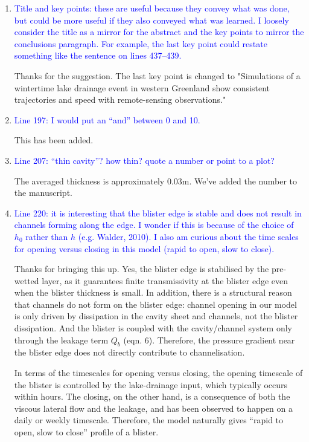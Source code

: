 \documentclass[11pt]{article}
\begin{document}
\begin{enumerate}
\item \textcolor{blue}{Title and key points: these are useful because they convey what was done, but could be more useful if they also conveyed what was learned. I loosely consider the title as a mirror for the abstract and the key points to mirror the conclusions paragraph. For example, the last key point could restate something like the sentence on lines 437--439.}

Thanks for the suggestion. The last key point is changed to "Simulations of a wintertime lake drainage event in western Greenland show consistent trajectories and speed with remote-sensing observations."

\item \textcolor{blue}{Line 197: I would put an ``and'' between 0 and 10.}

This has been added.

\item \textcolor{blue}{Line 207: ``thin cavity''? how thin? quote a number or point to a plot?}

The averaged thickness is approximately $0.03$m. We've added the number to the manuscript.

\item \textcolor{blue}{Line 220: it is interesting that the blister edge is stable and does not result in channels forming along the edge. I wonder if this is because of the choice of $h_0$ rather than $h$ (e.g. Walder, 2010). I also am curious about the time scales for opening versus closing in this model (rapid to open, slow to close).}

Thanks for bringing this up. Yes, the blister edge is stabilised by the pre-wetted layer, as it guarantees finite transmissivity at the blister edge even when the blister thickness is small. In addition, there is a structural reason that channels do not form on the blister edge: channel opening in our model is only driven by dissipation in the cavity sheet and channels, not the blister dissipation. And the blister is coupled with the cavity/channel system only through the leakage term $Q_b$ (eqn. 6). Therefore, the pressure gradient near the blister edge does not directly contribute to channelisation.

In terms of the timescales for opening versus closing, the opening timescale of the blister is controlled by the lake-drainage input, which typically occurs within hours. The closing, on the other hand, is a consequence of both the viscous lateral flow and the leakage, and has been observed to happen on a daily or weekly timescale. Therefore, the model naturally gives ``rapid to open, slow to close'' profile of a blister.


\end{enumerate}
\end{document}
